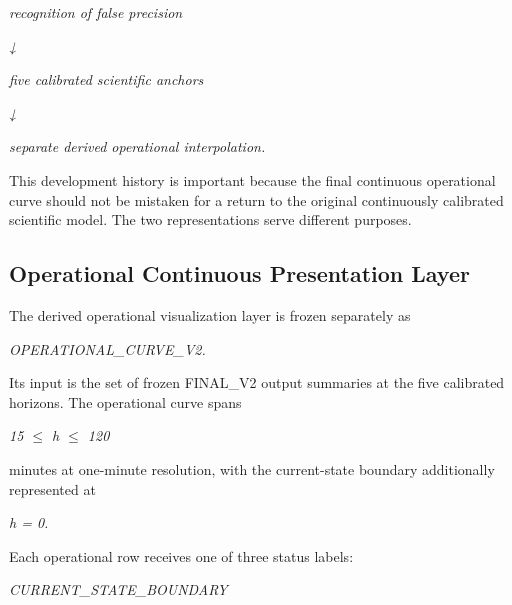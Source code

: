\begin{center}\textit{recognition of false precision}\end{center}

\begin{center}\textit{↓}\end{center}

\begin{center}\textit{five calibrated scientific anchors}\end{center}

\begin{center}\textit{↓}\end{center}

\begin{center}\textit{separate derived operational interpolation.}\end{center}

This development history is important because the final continuous operational curve should not be mistaken for a return to the original continuously calibrated scientific model. The two representations serve different purposes.

\subsection{Operational Continuous Presentation Layer}
The derived operational visualization layer is frozen separately as

\begin{center}\textit{OPERATIONAL\_CURVE\_V2.}\end{center}

Its input is the set of frozen FINAL\_V2 output summaries at the five calibrated horizons. The operational curve spans

\begin{center}\textit{15 \ensuremath{\le} h \ensuremath{\le} 120}\end{center}

minutes at one-minute resolution, with the current-state boundary additionally represented at

\begin{center}\textit{h = 0.}\end{center}

Each operational row receives one of three status labels:

\begin{center}\textit{CURRENT\_STATE\_BOUNDARY}\end{center}

